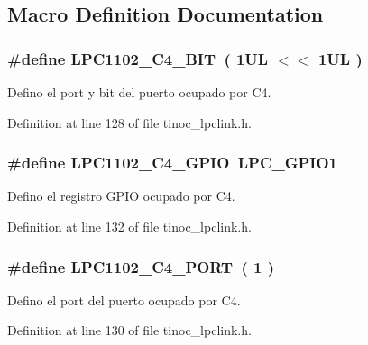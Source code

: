 \subsection{Macro Definition Documentation}
\subsubsection[{\texorpdfstring{L\+P\+C1102\+\_\+\+C4\+\_\+\+B\+IT}{LPC1102_C4_BIT}}]{\setlength{\rightskip}{0pt plus 5cm}\#define L\+P\+C1102\+\_\+\+C4\+\_\+\+B\+IT~( 1\+U\+L $<$$<$ 1\+U\+L )}\hypertarget{group___p_i_n_c4_ga6634a8d3b9fbbf4a90aa74fe9173de32}{}\label{group___p_i_n_c4_ga6634a8d3b9fbbf4a90aa74fe9173de32}


Defino el port y bit del puerto ocupado por C4. 



Definition at line 128 of file tinoc\+\_\+lpclink.\+h.

\subsubsection[{\texorpdfstring{L\+P\+C1102\+\_\+\+C4\+\_\+\+G\+P\+IO}{LPC1102_C4_GPIO}}]{\setlength{\rightskip}{0pt plus 5cm}\#define L\+P\+C1102\+\_\+\+C4\+\_\+\+G\+P\+IO~L\+P\+C\+\_\+\+G\+P\+I\+O1}\hypertarget{group___p_i_n_c4_gad0c89c3a531c5e51f42bd3bcadd0c214}{}\label{group___p_i_n_c4_gad0c89c3a531c5e51f42bd3bcadd0c214}


Defino el registro G\+P\+IO ocupado por C4. 



Definition at line 132 of file tinoc\+\_\+lpclink.\+h.

\subsubsection[{\texorpdfstring{L\+P\+C1102\+\_\+\+C4\+\_\+\+P\+O\+RT}{LPC1102_C4_PORT}}]{\setlength{\rightskip}{0pt plus 5cm}\#define L\+P\+C1102\+\_\+\+C4\+\_\+\+P\+O\+RT~( 1 )}\hypertarget{group___p_i_n_c4_gacd93f24da1e5789ee014bc52402d0bb5}{}\label{group___p_i_n_c4_gacd93f24da1e5789ee014bc52402d0bb5}


Defino el port del puerto ocupado por C4. 



Definition at line 130 of file tinoc\+\_\+lpclink.\+h.

